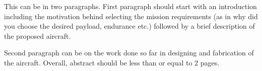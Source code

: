 \abstract 

\vspace*{10pt}

\noindent 

This can be in two paragraphs.
First paragraph should start with an introduction including the motivation behind selecting the mission requirements (as in why did you choose the desired payload, endurance etc.) followed by a brief description of the proposed aircraft.

Second paragraph can be on the work done so far in designing and fabrication of the aircraft.
Overall, abstract should be less than or equal to 2 pages.
